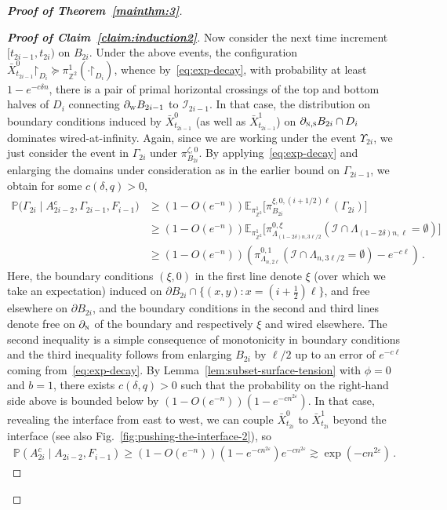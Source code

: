 \documentclass[reqno,11pt]{amsart}
\numberwithin{equation}{section}
\renewcommand{\restriction}{\mathord{\upharpoonright}}
\renewcommand{\epsilon}{\varepsilon}
\theoremstyle{definition}{
\newtheorem{example}[theorem]{Example}
\newtheorem{definition}[theorem]{Definition}
\newtheorem*{definition*}{Definition}
\newtheorem{problem}[theorem]{Problem}
\newtheorem{question}[theorem]{Question}
\newtheorem{remark}[theorem]{Remark}
}
\renewcommand{\epsilon}{\varepsilon}
\newcommand{\north}{{\textsc{n}}}
\newcommand{\south}{{\textsc{s}}}
\newcommand{\west}{{\textsc{w}}}
\begin{document}
\begin{proof}[\textbf{\emph{Proof of Theorem~\ref{mainthm:3}}}]
\begin{proof}[\textbf{\emph{Proof of Claim~\ref{claim:induction2}}}]
Now consider the next time increment $[t_{2i-1},t_{2i})$ on $B_{2i}$. Under the above events, the configuration $\bar X_{t_{2i-1}}^0\restriction_{D_i} \succeq \pi_{\mathbb Z^2}^1 (\cdot \restriction_{D_i})$, whence by~\eqref{eq:exp-decay}, with probability at least $1-e^{-c\delta n}$, there is a pair of primal horizontal crossings of the top and bottom halves of $D_i$ connecting  $\partial_{\west}B_{2i-1}$ to $\mathcal I_{2i-1}$. In that case, the distribution on boundary conditions induced by $\bar X^0_{t_{2i-1}}$ (as well as $\bar X^1_{t_{2i-1}}$) on $\partial_{\north, \south} B_{2i} \cap D_i$ dominates wired-at-infinity. Again, since we are working under the event $\Upsilon_{2i}$, we just consider the event in $\Gamma_{2i}$ under $\pi^{\zeta,0}_{B_{2i}}$. By applying~\eqref{eq:exp-decay} and enlarging the domains under consideration as in the earlier bound on $ \Gamma_{2i-1}$, we obtain for some $c(\delta,q)>0$,
\begin{align*}
\mathbb P\Big( \Gamma_{2i} \mid A_{2i-2}^c,  \Gamma_{2i-1}, F_{i-1}\Big) & \geq (1-O(e^{-n}))\mathbb E_{\pi_{\mathbb Z^2}^1} \big[ \pi_{B_{2i}}^{\xi,0,(i+1/2)\ell}(\Gamma_{2i})\big] \\
& \geq (1-O({e^{-n}})) \mathbb E_{\pi_{\mathbb Z^2}^1}\big[ \pi_{\Lambda_{(1-2\delta) n,3\ell /2}}^{0,\xi}(\mathcal I\cap \Lambda_{(1-2\delta) n, \ell}= \emptyset)\big] \\
& \geq (1-O(e^{-n})) (\pi_{\Lambda_{n,2\ell}}^{0,1}(\mathcal I \cap \Lambda_{n,3\ell/2}= \emptyset)-e^{-c\ell})\,.
\end{align*}
Here, the boundary conditions $(\xi,0)$ in the first line denote $\xi$ (over which we take an expectation) induced on $\partial B_{2i}\cap \{(x,y):x=(i+\frac 12) \ell\}$, and free elsewhere on $\partial B_{2i}$, and the boundary conditions in the second and third lines denote free on $\partial_\north$ of the boundary and respectively $\xi$ and wired elsewhere. The second inequality is a simple consequence of monotonicity in boundary conditions and the third inequality follows from enlarging $B_{2i}$ by $\ell/2$ up to an error of $e^{-c \ell}$ coming from~\eqref{eq:exp-decay}.
By Lemma~\ref{lem:subset-surface-tension} with $\phi=0$ and $b=1$, there exists $c(\delta,q)>0$ such that the probability on the right-hand side above is bounded below by $(1-O(e^{-n})) (1-e^{-cn^{2\epsilon}})$. In that case, revealing the interface from east to west, we can couple $\bar X^0_{t_{2i}}$ to $\bar X^1_{t_{2i}}$ beyond the interface (see also Fig.~\ref{fig:pushing-the-interface-2}), so
\begin{align}\label{eq:A-2i-c-bound}
\mathbb P(A_{2i}^c \mid A_{2i-2}, F_{i-1}) \geq (1-O(e^{-n}))(1-e^{-cn^{2\epsilon}})e^{-cn^{2\epsilon}} \gtrsim \exp({-cn^{2\epsilon}})\,.
\end{align}


\end{proof}
\end{proof}
\end{document}
